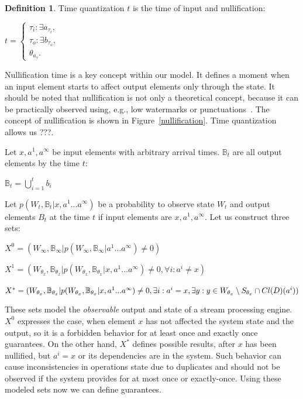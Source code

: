 \documentclass[sigconf]{acmart}
\theoremstyle{definition}
\newtheorem{definition}{Definition}
\begin{document}
\begin{definition}{Time quantization}
$t$ is the time of input and nullification:

$t=\begin{cases}
\tau_i:\exists{a_{\tau_i}}, \\
\tau_o:\exists{b_{\tau_o}}, \\
\theta_{a_\tau}.
\end{cases}$
\end{definition}

Nullification time is a key concept within our model. It defines a moment when an input element starts to affect output elements only through the state. It should be noted that nullification is not only a theoretical concept, because it can be practically observed using, e.g., low watermarks or punctuations~\cite{Tucker:2003:EPS:776752.776780}. The concept of nullification is shown in Figure~\ref{nullification}. Time quantization allows us ???.

Let $x,a^{1},a^\infty$ be input elements with arbitrary arrival times. $\mathbb{B}_t$ are all output elements by the time $t$:

$\mathbb{B}_t=\bigcup\limits_{i=1}^{t}{b_i}$

Let $p(W_t,\mathbb{B}_t|x,a^{1}...a^\infty)$ be a probability to observe state $W_t$ and output elements $B_t$ at the time $t$ if input elements are $x,a^{1},a^\infty$. Let us construct three sets:

$X^0=(W_\infty,\mathbb{B}_\infty|p(W_\infty,\mathbb{B}_\infty|a^{1}...a^\infty)\neq{0})$

$X^1=(W_{\theta_{x}},\mathbb{B}_{\theta_{x}}|p(W_{\theta_{x}},\mathbb{B}_{\theta_{x}}|x,a^{1}...a^\infty)\neq{0},\forall{i}:{a^i}\neq{x})$

$X^{*}=(W_{\theta_{x}},\mathbb{B}_{\theta_{x}}|p(W_{\theta_{x}},\mathbb{B}_{\theta_{x}}|x,a^{1}...a^\infty)\neq{0},\\
\exists{i}:{a^i={x}},\exists{y:y\in{W_{\theta_{x}}\setminus{S_{\theta_x}}}\cap{Cl(D)(a^i)}})$

These sets model the {\em observable} output and state of a stream processing engine. $X^0$ expresses the case, when element $x$ has not affected the system state and the output, so it is a forbidden behavior for at least once and exactly once guarantees. On the other hand, $X^{*}$ defines possible results, after $x$ has been nullified, but $a^i=x$ or its dependencies are in the system. Such behavior can cause inconsistencies in operations state due to duplicates and should not be observed if the system provides for at most once or exactly-once. Using these modeled sets now we can define guarantees.
\end{document}

